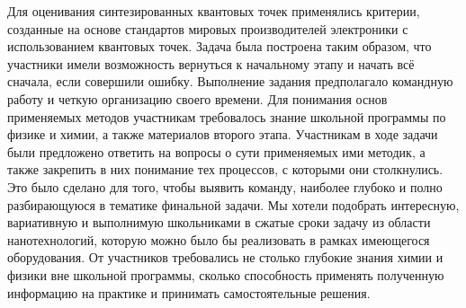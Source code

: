 Для оценивания синтезированных квантовых точек применялись критерии, созданные на основе стандартов мировых производителей электроники с использованием квантовых точек. Задача была построена таким образом, что участники имели возможность вернуться к начальному этапу и начать всё сначала, если совершили ошибку. Выполнение задания предполагало командную работу и четкую организацию своего времени. Для понимания основ применяемых методов участникам требовалось знание школьной программы по физике и химии, а также материалов второго этапа. Участникам в ходе задачи были предложено ответить на вопросы о сути применяемых ими методик, а также закрепить в них понимание тех процессов, с которыми они столкнулись. Это было сделано для того, чтобы выявить команду, наиболее глубоко и полно разбирающуюся в тематике финальной задачи. Мы хотели подобрать интересную, вариативную и выполнимую школьниками в сжатые сроки задачу из области нанотехнологий, которую можно было бы реализовать в рамках имеющегося оборудования. От участников требовались не столько глубокие знания химии и физики вне школьной программы, сколько способность применять полученную информацию на практике и принимать самостоятельные решения.

\clearpage
\endgroup